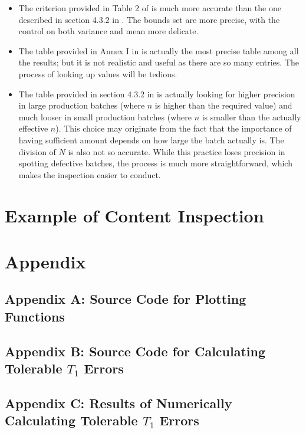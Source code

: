 \documentclass[12pt]{article}
\begin{document}
\begin{itemize}
    \item The criterion provided in Table 2 of \cite{OIML2016} is much more accurate than the one described in section 4.3.2 in \cite{JJF2005}. The bounds set are more precise, with the control on both variance and mean more delicate.
    \item The table provided in Annex I in \cite{OIML2016} is actually the most precise table among all the results; but it is not realistic and useful as there are so many entries. The process of looking up values will be tedious. 
    \item The table provided in section 4.3.2 in \cite{JJF2005} is actually looking for higher precision in large production batches (where $n$ is higher than the required value) and much looser in small production batches (where $n$ is smaller than the actually effective $n$). This choice may originate from the fact that the importance of having sufficient amount depends on how large the batch actually is. The division of $N$ is also not so accurate. While this practice loses precision in spotting defective batches, the process is much more straightforward, which makes the inspection easier to conduct. 
\end{itemize}

\section{Example of Content Inspection}



\newpage
\section{Appendix}

\subsection{Appendix A: Source Code for Plotting Functions}
\label{mmacode}

\subsection{Appendix B: Source Code for Calculating Tolerable $T_1$ Errors}
\label{cppcode}

\subsection{Appendix C: Results of Numerically Calculating Tolerable $T_1$ Errors}
\label{toleranceres}
\end{document}
